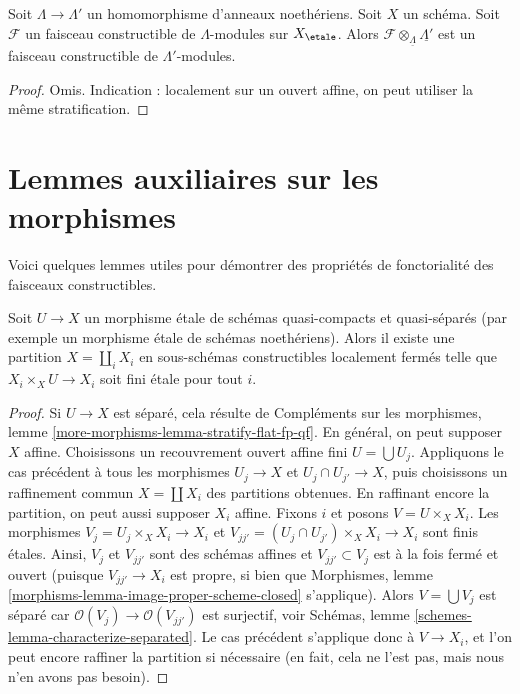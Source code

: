 \begin{lemma}
\label{lemma-tensor-constructible}
Soit $\Lambda \to \Lambda'$ un homomorphisme d'anneaux noethériens.
Soit $X$ un schéma. Soit $\mathcal{F}$ un faisceau constructible
de $\Lambda$-modules sur $X_\etale$. Alors
$\mathcal{F} \otimes_{\underline{\Lambda}} \underline{\Lambda'}$
est un faisceau constructible de $\Lambda'$-modules.
\end{lemma}

\begin{proof}
Omis. Indication : localement sur un ouvert affine, on peut utiliser la même stratification.
\end{proof}










\section{Lemmes auxiliaires sur les morphismes}
\label{section-stratify-morphisms}

\noindent
Voici quelques lemmes utiles pour d\'emontrer des propri\'et\'es de fonctorialit\'e
des faisceaux constructibles.

\begin{lemma}
\label{lemma-etale-stratified-finite}
Soit $U \to X$ un morphisme \'etale de sch\'emas quasi-compacts et quasi-s\'epar\'es
(par exemple un morphisme \'etale de sch\'emas noeth\'eriens). Alors il
existe une partition $X = \coprod_i X_i$ en sous-sch\'emas constructibles
localement ferm\'es telle que $X_i \times_X U \to X_i$ soit fini \'etale pour tout $i$.
\end{lemma}

\begin{proof}
Si $U \to X$ est s\'epar\'e, cela r\'esulte de
Compléments sur les morphismes, lemme \ref{more-morphisms-lemma-stratify-flat-fp-qf}.
En g\'en\'eral, on peut supposer $X$ affine. Choisissons un recouvrement ouvert
affine fini $U = \bigcup U_j$. Appliquons le cas pr\'ec\'edent \`a tous les morphismes
$U_j \to X$ et $U_j \cap U_{j'} \to X$, puis choisissons un raffinement
commun $X = \coprod X_i$ des partitions obtenues.
En raffinant encore la partition, on peut aussi supposer $X_i$ affine.
Fixons $i$ et posons $V = U \times_X X_i$. Les morphismes
$V_j = U_j \times_X X_i \to X_i$ et
$V_{jj'} = (U_j \cap U_{j'}) \times_X X_i \to X_i$ sont finis \'etales.
Ainsi, $V_j$ et $V_{jj'}$ sont des sch\'emas affines et $V_{jj'} \subset V_j$
est \`a la fois ferm\'e et ouvert (puisque $V_{jj'} \to X_i$ est propre, si bien que
Morphismes, lemme \ref{morphisms-lemma-image-proper-scheme-closed}
s'applique). Alors $V = \bigcup V_j$ est s\'epar\'e car
$\mathcal{O}(V_j) \to \mathcal{O}(V_{jj'})$ est surjectif, voir
Schémas, lemme \ref{schemes-lemma-characterize-separated}.
Le cas pr\'ec\'edent s'applique donc \`a $V \to X_i$, et l'on peut encore
raffiner la partition si n\'ecessaire (en fait, cela ne l'est pas, mais nous n'en
avons pas besoin).
\end{proof}

